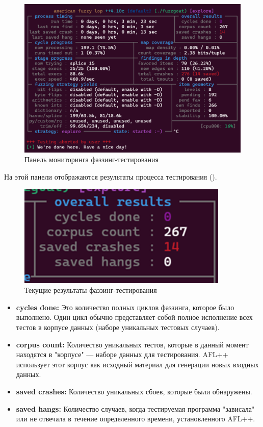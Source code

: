 \begin{figure}[ht] 
	\center
	\includegraphics [scale=1] {my_folder/images/fuzz_panel}
	\caption{Панель мониторинга фаззинг-тестирования} 
	\label{fig:fuzz-panel-ch4}  
\end{figure}

На этой панели отображаются результаты процесса тестирования ().

\begin{figure}[ht] 
	\center
	\includegraphics [scale=1] {my_folder/images/overall_res}
	\caption{Текущие результаты фаззинг-тестирования} 
	\label{fig:overall-res-ch4}  
\end{figure}

\begin{itemize}
	\item \textbf{cycles done:} Это количество полных циклов фаззинга, которое было выполнено. Один цикл обычно представляет собой полное исполнение всех тестов в корпусе данных (наборе уникальных тестовых случаев).
	\item \textbf{corpus count:} Количество уникальных тестов, которые в данный момент находятся в "корпусе" — наборе данных для тестирования. AFL++ использует этот корпус как исходный материал для генерации новых входных данных.
	\item \textbf{saved crashes:} Количество уникальных сбоев, которые были обнаружены.
	\item \textbf{saved hangs:} Количество случаев, когда тестируемая программа "зависала" или не отвечала в течение определенного времени, установленного AFL++.
\end{itemize}


